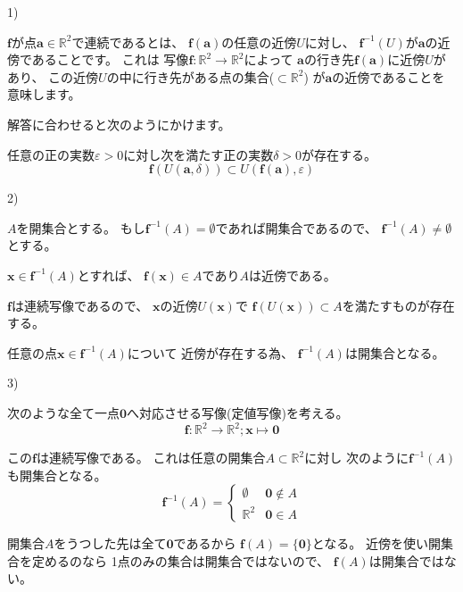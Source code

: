\documentclass[10pt,b5paper]{ltjsarticle}
\begin{document}
\dotfill

1)

$\bm{f}$が点$\bm{a}\in\mathbb{R}^2$で連続であるとは、
$\bm{f}(\bm{a})$の任意の近傍$U$に対し、
$\bm{f}^{-1}(U)$が$\bm{a}$の近傍であることです。
これは
写像$\bm{f}:\mathbb{R}^2 \rightarrow \mathbb{R}^2$によって
$\bm{a}$の行き先$\bm{f}(\bm{a})$に近傍$U$があり、
この近傍$U$の中に行き先がある点の集合($\subset \mathbb{R}^2$)
が$\bm{a}$の近傍であることを意味します。

解答に合わせると次のようにかけます。

任意の正の実数$\varepsilon >0$に対し次を満たす正の実数$\delta >0$が存在する。
\begin{equation}
 \bm{f}(U(\bm{a},\delta)) \subset U(\bm{f}(\bm{a}),\varepsilon)
\end{equation}

2)

$A$を開集合とする。
もし$\bm{f}^{-1}(A)=\emptyset$であれば開集合であるので、
$\bm{f}^{-1}(A)\ne \emptyset$とする。

$\bm{x}\in\bm{f}^{-1}(A)$とすれば、
$\bm{f}(\bm{x})\in A$であり$A$は近傍である。

$\bm{f}$は連続写像であるので、
$\bm{x}$の近傍$U(\bm{x})$で
$\bm{f}(U(\bm{x})) \subset A$を満たすものが存在する。

任意の点$\bm{x}\in\bm{f}^{-1}(A)$について
近傍が存在する為、
$\bm{f}^{-1}(A)$は開集合となる。

3)

次のような全て一点$\bm{0}$へ対応させる写像(定値写像)を考える。
\begin{equation}
 \bm{f}:\mathbb{R}^2 \rightarrow \mathbb{R}^2 ; \bm{x} \mapsto \bm{0}
\end{equation}

この$\bm{f}$は連続写像である。
これは任意の開集合$A\subset \mathbb{R}^2$に対し
次のように$\bm{f}^{-1}(A)$も開集合となる。
\begin{equation}
 \bm{f}^{-1}(A) =
 \begin{cases}
  \emptyset & \bm{0}\notin A\\
  \mathbb{R}^2 & \bm{0}\in A
 \end{cases}
\end{equation}

開集合$A$をうつした先は全て$\bm{0}$であるから
$\bm{f}(A)=\{\bm{0}\}$となる。
近傍を使い開集合を定めるのなら
1点のみの集合は開集合ではないので、
$\bm{f}(A)$は開集合ではない。
\end{document}
